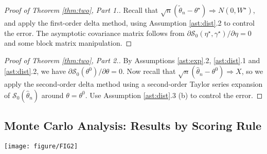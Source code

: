 \documentclass[12pt]{article}
\theoremstyle{definition}
\theoremstyle{remark}
\begin{document}
\begin{proof}[Proof of Theorem \ref{thm:two}, Part 1.]
Recall that $\sqrt{n}(\tilde{\theta}_{n} - \theta^{\star}) \Rightarrow N(0, W^{\star})$, and apply the first-order delta method, using Assumption \ref{ast:dist}.2 to control the error. The asymptotic covariance matrix follows from $\partial \mathcal{S}_0(\eta^{\star}, \gamma^{\star})/\partial \eta = 0$ and some block matrix manipulation.
\end{proof}

\begin{proof}[Proof of Theorem \ref{thm:two}, Part 2.]
By Assumptions \ref{ast:exp}.2, \ref{ast:dist}.1 and \ref{ast:dist}.2, we have $\partial \mathcal{S}_0(\theta^0) / \partial \theta = 0$. Now recall that $\sqrt{n}(\hat{\theta}_{n} - \theta^0) \Rightarrow X$, so we apply the second-order delta method using a second-order Taylor series expansion of $\mathcal{S}_0(\hat{\theta}_n)$ around $\theta = \theta^0$. Use Assumption \ref{ast:dist}.3 (b) to control the error.
\end{proof}

\subsection{Monte Carlo Analysis: Results by Scoring Rule\label{subsec:montecarlobyscore}}

\begin{figure*}[t]
\texttt{[image: figure/FIG2]}
\caption{The expectation of the difference between the out-of-sample one-step-ahead forecast performance of a misspecified forecast combination and that of the true DGP, over a range of sample sizes. \cite{Gneiting2007} call this quantity the expected divergence. The forecast combination is optimized in a one-stage (A and C, first column) or two-stage (B and D, second column) manner according to the log score (gold) or a censored log score that prioritizes accuracy in the lower 20\% tail of the forecast distribution (purple). The divergence is measured on the vertical axes according to the log score (A and B, first row) or the censored log score (C and D, second row). The expectations and confidence intervals are constructed as per Steps 8-10 in the text, with the 95\% confidence bounds appearing as small dashed lines.}
\label{fig:sim2}
\end{figure*}
\end{document}
